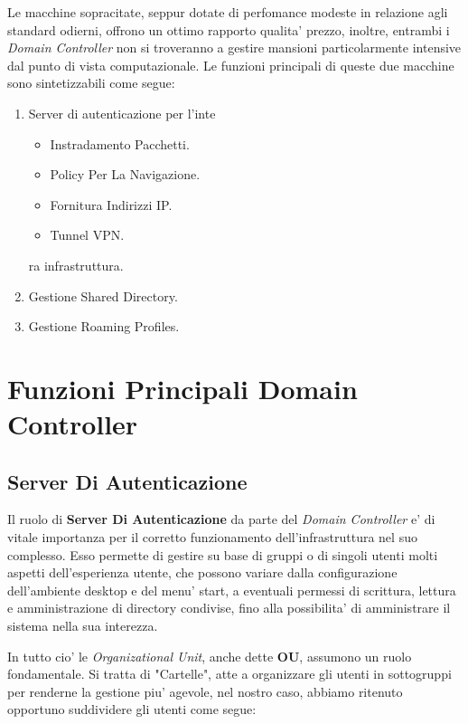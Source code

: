 \documentclass{report}
\begin{document}
        Le macchine sopracitate, seppur dotate di perfomance modeste in relazione agli standard odierni, offrono un ottimo 
         rapporto qualita' prezzo, inoltre, entrambi i \emph{Domain Controller} non si troveranno a gestire mansioni 
         particolarmente intensive dal punto di vista computazionale.
        Le funzioni principali di queste due macchine sono sintetizzabili come segue:
        \begin{enumerate}
            \item Server di autenticazione per l'inte        \begin{itemize}
                \item Instradamento Pacchetti.
                \item Policy Per La Navigazione.
                \item Fornitura Indirizzi IP.
                \item Tunnel VPN.
            \end{itemize}ra infrastruttura.
            \item Gestione Shared Directory.
            \item Gestione Roaming Profiles.
        \end{enumerate}
        \section{Funzioni Principali Domain Controller}
            \subsection{Server Di Autenticazione}
            Il ruolo di \textbf{Server Di Autenticazione} da parte del \emph{Domain Controller} e' di vitale importanza
             per il corretto funzionamento dell'infrastruttura nel suo complesso. Esso permette di gestire su base di 
             gruppi o di singoli utenti molti aspetti dell'esperienza utente, che possono variare dalla configurazione
             dell'ambiente desktop e del menu' start, a eventuali permessi di scrittura, lettura e amministrazione di
             directory condivise, fino alla possibilita' di amministrare il sistema nella sua interezza.
            
            In tutto cio' le \emph{Organizational Unit}, anche dette \textbf{OU}, assumono un ruolo fondamentale. Si 
             tratta di "Cartelle", atte a organizzare gli utenti in sottogruppi per renderne la gestione piu' agevole,
             nel nostro caso, abbiamo ritenuto opportuno suddividere gli utenti come segue:
\end{document}
